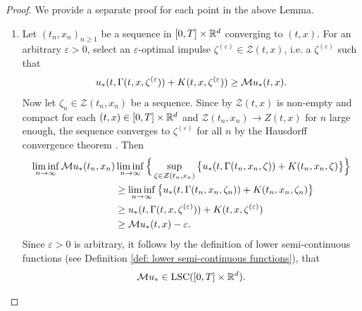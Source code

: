 \begin{proof}
    We provide a separate proof for each point in the above Lemma. 
    \begin{enumerate}[label=(\roman*)]
        \item Let $(t_n,x_n)_{n \geq 1}$ be a sequence in $[0,T] \times \mathbb{R}^d$ converging to $(t,x)$. For an arbitrary $\varepsilon > 0$, select an $\varepsilon$-optimal impulse $\zeta^{(\varepsilon)} \in \mathcal{Z}(t,x)$, i.e. a $\zeta^{(\varepsilon)}$ such that
        \begin{equation*}
            u_*(t,\Gamma(t,x, \zeta^{(\varepsilon})) + K(t,x,\zeta^{(\varepsilon})) \geq \mathcal{M} u_*(t,x). 
        \end{equation*}
        Now let $\zeta_n \in \mathcal{Z}(t_n,x_n)$ be a sequence. Since by  $\mathcal{Z}(t,x)$ is non-empty and compact for each $(t,x) \in [0,T] \times \mathbb{R}^d$ and $\mathcal{Z}(t_n,x_n) \rightarrow Z(t,x)$ for $n$ large enough, the sequence converges to $\zeta^{(\varepsilon)}$ for all $n$ by the Hausdorff convergence theorem \cite[Chapter 7]{burago2001course}. Then
        \begin{align*}
            \liminf_{n \rightarrow \infty} \mathcal{M} u_*(t_n,x_n) & \liminf_{n \rightarrow \infty} \Big\{ \sup_{\zeta \in \mathcal{Z}(t_n,x_n)}\big\{u_*(t,\Gamma(t_n,x_n,\zeta)) + K(t_n,x_n,\zeta)\big\} \Big\}\\
            & \geq \liminf_{n \rightarrow \infty} \big\{u_*(t,\Gamma(t_n,x_n,\zeta_n)) + K(t_n,x_n,\zeta_n)\big\} \\
            & \geq u_*(t,\Gamma(t,x,\zeta^{(\varepsilon)})) + K(t,x,\zeta^{(\varepsilon)}) \\
            & \geq \mathcal{M} u_* (t,x) - \varepsilon.
        \end{align*}
        Since $\varepsilon > 0$ is arbitrary, it follows by the definition of lower semi-continuous functions (see Definition \ref{def: lower semi-continuous functions}), that 
        \begin{equation*}
            \mathcal{M} u_* \in \operatorname{LSC}([0,T] \times \mathbb{R}^d). 
        \end{equation*}
        

\end{enumerate}
\end{proof}
